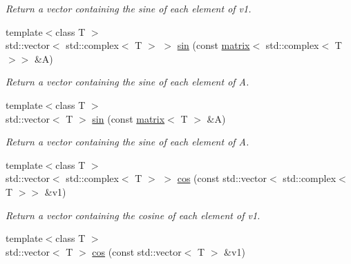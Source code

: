 \begin{DoxyCompactItemize}
\begin{DoxyCompactList}\small\item\em Return a vector containing the sine of each element of v1. \end{DoxyCompactList}\item 
\hypertarget{namespacekeycpp_a7d66a7287374d8e1e685538e0363101e}{{\footnotesize template$<$class T $>$ }\\std\-::vector$<$ std\-::complex$<$ T $>$ $>$ \hyperlink{namespacekeycpp_a7d66a7287374d8e1e685538e0363101e}{sin} (const \hyperlink{classkeycpp_1_1matrix}{matrix}$<$ std\-::complex$<$ T $>$$>$ \&A)}\label{namespacekeycpp_a7d66a7287374d8e1e685538e0363101e}

\begin{DoxyCompactList}\small\item\em Return a vector containing the sine of each element of A. \end{DoxyCompactList}\item 
\hypertarget{namespacekeycpp_a0dd3aac5066a4d3e2c7108b26c554605}{{\footnotesize template$<$class T $>$ }\\std\-::vector$<$ T $>$ \hyperlink{namespacekeycpp_a0dd3aac5066a4d3e2c7108b26c554605}{sin} (const \hyperlink{classkeycpp_1_1matrix}{matrix}$<$ T $>$ \&A)}\label{namespacekeycpp_a0dd3aac5066a4d3e2c7108b26c554605}

\begin{DoxyCompactList}\small\item\em Return a vector containing the sine of each element of A. \end{DoxyCompactList}\item 
\hypertarget{namespacekeycpp_a9b3d958e47ae678b0818a166d5a75883}{{\footnotesize template$<$class T $>$ }\\std\-::vector$<$ std\-::complex$<$ T $>$ $>$ \hyperlink{namespacekeycpp_a9b3d958e47ae678b0818a166d5a75883}{cos} (const std\-::vector$<$ std\-::complex$<$ T $>$$>$ \&v1)}\label{namespacekeycpp_a9b3d958e47ae678b0818a166d5a75883}

\begin{DoxyCompactList}\small\item\em Return a vector containing the cosine of each element of v1. \end{DoxyCompactList}\item 
\hypertarget{namespacekeycpp_a51d6592d124735f2377e1a2c43985b94}{{\footnotesize template$<$class T $>$ }\\std\-::vector$<$ T $>$ \hyperlink{namespacekeycpp_a51d6592d124735f2377e1a2c43985b94}{cos} (const std\-::vector$<$ T $>$ \&v1)}\label{namespacekeycpp_a51d6592d124735f2377e1a2c43985b94}


\end{DoxyCompactItemize}
